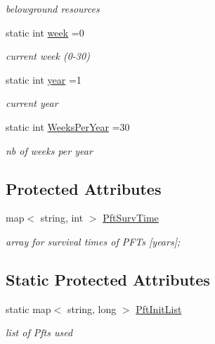 \begin{DoxyCompactItemize}
\begin{DoxyCompactList}\small\item\em belowground resources \end{DoxyCompactList}\item 
static int \mbox{\hyperlink{class_c_envir_a947969beb1b553371357e2ebf51b5234}{week}} =0
\begin{DoxyCompactList}\small\item\em current week (0-\/30) \end{DoxyCompactList}\item 
static int \mbox{\hyperlink{class_c_envir_ae5d7965547f76a4a9191e85e953737e6}{year}} =1
\begin{DoxyCompactList}\small\item\em current year \end{DoxyCompactList}\item 
\mbox{\label{class_c_envir_aa20c2d3262d9c75624d0bec58d8a6949}} 
static int \mbox{\hyperlink{class_c_envir_aa20c2d3262d9c75624d0bec58d8a6949}{Weeks\+Per\+Year}} =30
\begin{DoxyCompactList}\small\item\em nb of weeks per year \end{DoxyCompactList}\end{DoxyCompactItemize}
\subsection*{Protected Attributes}
\begin{DoxyCompactItemize}
\item 
\mbox{\label{class_c_envir_aeaed4f1f486b5324d6b16bad0c0b0230}} 
map$<$ string, int $>$ \mbox{\hyperlink{class_c_envir_aeaed4f1f486b5324d6b16bad0c0b0230}{Pft\+Surv\+Time}}
\begin{DoxyCompactList}\small\item\em array for survival times of P\+F\+Ts \mbox{[}years\mbox{]}; \end{DoxyCompactList}\end{DoxyCompactItemize}
\subsection*{Static Protected Attributes}
\begin{DoxyCompactItemize}
\item 
\mbox{\label{class_c_envir_acc30eeae2fd0bf37db469356c1ab4729}} 
static map$<$ string, long $>$ \mbox{\hyperlink{class_c_envir_acc30eeae2fd0bf37db469356c1ab4729}{Pft\+Init\+List}}
\begin{DoxyCompactList}\small\item\em list of Pfts used \end{DoxyCompactList}\end{DoxyCompactItemize}



